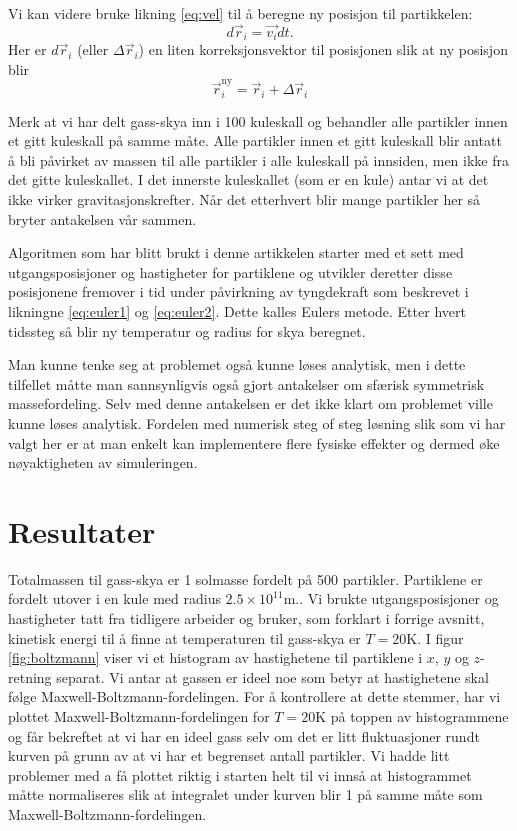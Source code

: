 \documentclass[reprint,english,notitlepage]{revtex4-1}  %
\begin{document}
Vi kan videre bruke likning \ref{eq:vel} til å beregne ny posisjon til partikkelen:
\[
d\vec{r}_i=\vec{v_i}dt.
\]
Her er $d\vec{r}_i$ (eller $\Delta\vec{r}_i$) en liten korreksjonsvektor til posisjonen slik at ny posisjon blir
\begin{equation}
\label{eq:euler2}
\vec{r}_i^\mathrm{ny}=\vec{r}_i+\Delta\vec{r}_i
\end{equation}

Merk at vi har delt gass-skya inn i 100 kuleskall og behandler alle partikler innen et gitt kuleskall på samme måte. Alle partikler innen et gitt kuleskall blir antatt å bli påvirket av massen til alle partikler i alle kuleskall på innsiden, men ikke fra det gitte kuleskallet. I det innerste kuleskallet (som er en kule) antar vi at det ikke virker gravitasjonskrefter. Når det etterhvert blir mange partikler her så bryter antakelsen vår sammen.

Algoritmen som har blitt brukt i denne artikkelen starter med et sett med utgangsposisjoner og hastigheter for partiklene og utvikler deretter disse posisjonene fremover i tid under påvirkning av tyngdekraft som beskrevet i likningne \ref{eq:euler1} og \ref{eq:euler2}. Dette kalles Eulers metode. Etter hvert tidssteg så blir ny temperatur og radius for skya beregnet. 

Man kunne tenke seg at problemet også kunne løses analytisk, men i dette tilfellet måtte man sannsynligvis også gjort antakelser om sfærisk symmetrisk massefordeling. Selv med denne antakelsen er det ikke klart om problemet ville kunne løses analytisk. Fordelen med numerisk steg of steg løsning slik som vi har valgt her er at man enkelt kan implementere flere fysiske effekter og dermed øke nøyaktigheten av simuleringen.

\section{Resultater}

Totalmassen til gass-skya er 1 solmasse fordelt på 500 partikler. Partiklene er fordelt utover i en kule med radius $2.5\times10^{11}$m.. Vi brukte utgangsposisjoner og hastigheter tatt fra tidligere arbeider \citep{part1A} og bruker, som forklart i forrige avsnitt, kinetisk energi til å finne at temperaturen til gass-skya er $T=20$K. I figur \ref{fig:boltzmann} viser vi et histogram av hastighetene til partiklene i $x$, $y$ og $z$-retning separat.  Vi antar at gassen er ideel noe som betyr at hastighetene skal følge Maxwell-Boltzmann-fordelingen. For å kontrollere at dette stemmer, har vi plottet  Maxwell-Boltzmann-fordelingen for $T=20$K på toppen av histogrammene og får bekreftet at vi har en ideel gass selv om det er litt fluktuasjoner rundt kurven på grunn av at vi har et begrenset antall partikler. Vi hadde litt problemer med a få plottet riktig i starten helt til vi innså at histogrammet måtte normaliseres slik at integralet under kurven blir 1 på samme måte som Maxwell-Boltzmann-fordelingen.
\end{document}
